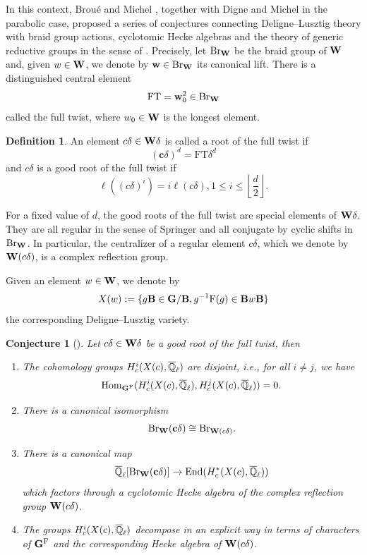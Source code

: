 \documentclass[article, 10pt, oneside, reqno]{amsart}
\theoremstyle{plain}
\newtheorem{conj}[thm]{Conjecture}
\theoremstyle{definition}
\newtheorem{defi}[thm]{Definition}
\theoremstyle{remark}
\newcommand{\FT}{\mathrm{FT}}
\newcommand{\cbf}{\mathbf{c}}
\newcommand{\wbf}{\mathbf{w}}
\begin{document}
In this context, Broué and Michel \cite{BroueMichelActionRegularElements}, together with Digne and Michel \cite{DigneMichelParabolic} in the parabolic case, proposed a series of conjectures connecting Deligne--Lusztig theory with braid group actions, cyclotomic Hecke algebras \cite{BroueMalleCyclotomicHeckeAlg} and the theory of generic reductive groups in the sense of \cite{BroueMalle, BroueMalleMichel}.  Precisely, let $\mathrm{Br}_{\mathbf{W}}$ be the braid group of $\mathbf{W}$ and, given $w \in \mathbf{W}$, we denote by $\wbf \in \Br_{\Wbf}$ its canonical lift. There is a distinguished central element 
$$\FT = \wbf_0^2 \in \Br_{\Wbf}$$ 
called the full twist, where $w_0 \in \mathbf{W}$ is the longest element. 

\begin{defi}
An element $c\delta \in \mathbf{W}\delta$ is called a root of the full twist if 
$$(\cbf\delta)^d = \FT\delta^d$$
and $c\delta$ is a good root of the full twist if 
$$\ell((c\delta)^i) = i\ell(c\delta), 1 \leq i \leq \left\lfloor \frac{d}{2}\right\rfloor.$$ 
\end{defi}

For a fixed value of $d$, the good roots of the full twist are special elements of $\mathbf{W}\delta$. They are all regular in the sense of Springer \cite{SpringerRegularElements} and all conjugate by cyclic shifts in $\mathrm{Br}_{\mathbf{W}}$. In particular, the centralizer of a regular element $c\delta$, which we denote by $\mathbf{W}(c\delta)$, is a complex reflection group. 

 Given an element $w \in \mathbf{W}$, we denote by 
$$X(w) := \{g\mathbf{B} \in \mathbf{G}/\mathbf{B}, g^{-1}\mathrm{F}(g) \in \mathbf{B} w\mathbf{B}\}$$
the corresponding Deligne--Lusztig variety.

\begin{conj}[]\label{conj-intro:BroueMichel}
Let $c\delta \in \mathbf{W}\delta$ be a good root of the full twist, then 
\begin{enumerate}
\item The cohomology groups $H^i_c(X(c), \overline{\mathbb{Q}}_{\ell})$ are disjoint, i.e., for all $i \neq j$, we have 
$$\mathrm{Hom}_{\mathbf{G}^{\mathrm{F}}}(H^i_c(X(c), \overline{\mathbb{Q}}_{\ell}), H^j_c(X(c), \overline{\mathbb{Q}}_{\ell})) = 0.$$
\item There is a canonical isomorphism 
$$\Br_{\Wbf}(\cbf\delta) \cong \Br_{\Wbf(c\delta)}.$$
\item There is a canonical map 
$$\Qlb[\Br_{\Wbf}(\cbf\delta)] \to \End(H^*_c(X(c), \Qlb))$$
which factors through a cyclotomic Hecke algebra of the complex reflection group $\mathbf{W}(c\delta)$. 
\item The groups $H^i_c(X(c), \overline{\mathbb{Q}}_{\ell})$ decompose in an explicit way in terms of characters of $\mathbf{G}^{\mathrm{F}}$ and the corresponding Hecke algebra of $\mathbf{W}(c\delta)$.
\end{enumerate}
\end{conj}
\end{document}
